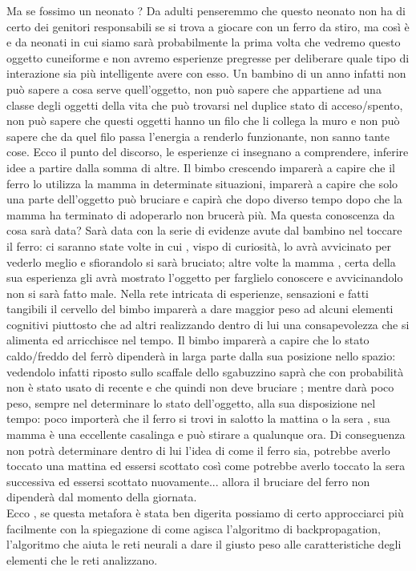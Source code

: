 Ma se fossimo un neonato ? Da adulti penseremmo che questo neonato non ha di certo dei genitori responsabili se si trova a giocare con un ferro da stiro, ma così è e da neonati in cui siamo sarà probabilmente la prima volta che vedremo questo oggetto cuneiforme e non avremo esperienze pregresse per deliberare quale tipo di interazione sia più intelligente avere con esso. Un bambino di un anno infatti non può sapere a cosa serve quell'oggetto, non può sapere che appartiene ad una classe degli oggetti della vita che può trovarsi nel duplice stato di acceso/spento, non può sapere che questi oggetti hanno un filo che li collega la muro e non può sapere che da quel filo passa l'energia a renderlo funzionante, non sanno tante cose. Ecco il punto del discorso, le esperienze ci insegnano a comprendere, inferire idee a partire dalla somma di altre. Il bimbo crescendo imparerà a capire che il ferro lo utilizza la mamma in determinate situazioni, imparerà a capire che solo una parte dell'oggetto può bruciare e capirà che dopo diverso tempo dopo che la mamma ha terminato di adoperarlo non brucerà più. Ma questa conoscenza da cosa sarà data? Sarà data con la serie di evidenze avute dal bambino nel toccare il ferro: ci saranno state volte in cui , vispo di curiosità, lo avrà avvicinato per vederlo meglio e sfiorandolo si sarà bruciato; altre volte la mamma , certa della sua esperienza gli avrà mostrato l'oggetto per farglielo conoscere e avvicinandolo non si sarà fatto male. Nella rete intricata di esperienze, sensazioni e fatti tangibili il cervello del bimbo imparerà a dare maggior peso ad alcuni elementi cognitivi piuttosto che ad altri realizzando dentro di lui una consapevolezza che si alimenta ed arricchisce nel tempo. Il bimbo imparerà a capire che lo stato caldo/freddo del ferrò dipenderà in larga parte dalla sua posizione nello spazio: vedendolo infatti riposto sullo scaffale dello sgabuzzino saprà che con probabilità non è stato usato di recente e che quindi non deve bruciare ; mentre darà poco peso, sempre nel determinare lo stato dell'oggetto, alla sua disposizione nel tempo: poco importerà che il ferro si trovi in salotto la mattina o la sera , sua mamma è una eccellente casalinga e può stirare a qualunque ora. Di conseguenza non potrà determinare dentro di lui l'idea di come il ferro sia, potrebbe averlo toccato una mattina ed essersi scottato così come potrebbe averlo toccato la sera successiva ed essersi scottato nuovamente... allora il bruciare del ferro non dipenderà dal momento della giornata. 
\\
Ecco , se questa metafora è stata ben digerita possiamo di certo approcciarci più facilmente con la spiegazione di come agisca l'algoritmo di backpropagation, l'algoritmo che aiuta le reti neurali a dare il giusto peso alle caratteristiche degli elementi che le reti analizzano. 
